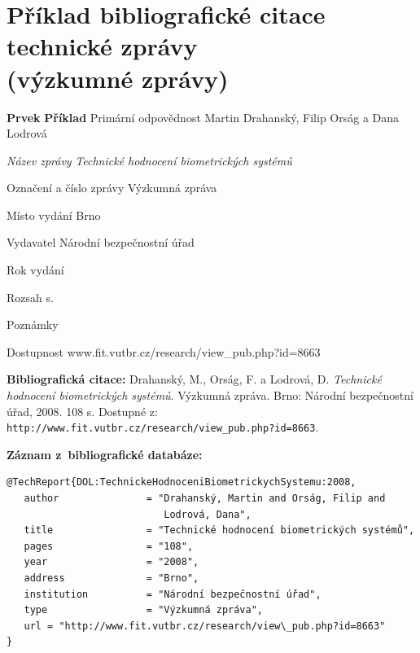 
\newpage
\section*{Příklad bibliografické citace technické zprávy \\ (výzkumné zprávy)}
\label{pr-vyzkum}
\begin{tabbing}
\zarazky
\textbf{Prvek} \> \textbf{Příklad} \odradkovani
Primární odpovědnost \>
Martin {\sc Drahanský}, Filip {\sc Orság} a Dana {\sc Lodrová}

\odradkovani
{\em Název zprávy} \>
{\em Technické hodnocení biometrických systémů}

\odradkovani
Označení a číslo zprávy \>
Výzkumná zpráva

\odradkovani
Místo vydání \>
Brno

\odradkovani
Vydavatel \>
Národní bezpečnostní úřad

\odradkovani
Rok vydání 

\odradkovani
Rozsah\footnotemark[1]  s.

\odradkovani
Poznámky\footnotemark[2] \>

\odradkovani
Dostupnost \>
www.{f}it.vutbr.cz/research/view\_pub.php?id=8663

\odradkovani
\end{tabbing}

\noindent \textbf{Bibliografická citace:} \odradkovani
{\sc Drahanský}, M., {\sc Orság}, F. a {\sc Lodrová}, D.
{\em Technické hodnocení biometrických systémů}. Výzkumná zpráva. Brno: Národní bezpečnostní
úřad, 2008. 108 s. Dostupné z: \\
{\tt http://www.fit.vutbr.cz/research/view\_pub.php?id=8663}.

\bigskip \bigskip
\noindent \textbf{Záznam z~bibliografické databáze:}
\vspace{-0.5em}
\begin{verbatim}
@TechReport{DOL:TechnickeHodnoceniBiometrickychSystemu:2008,
   author               = "Drahanský, Martin and Orság, Filip and
                           Lodrová, Dana",
   title                = "Technické hodnocení biometrických systémů",
   pages                = "108",
   year                 = "2008",
   address              = "Brno",
   institution          = "Národní bezpečnostní úřad",
   type                 = "Výzkumná zpráva",
   url = "http://www.fit.vutbr.cz/research/view\_pub.php?id=8663"
}
\end{verbatim}

